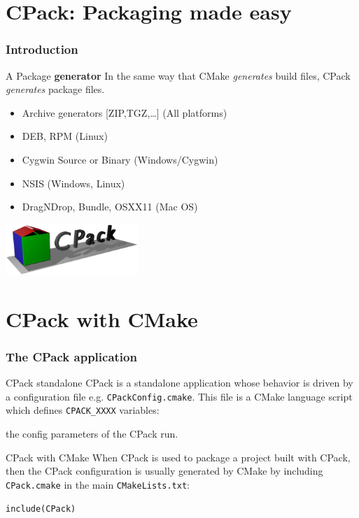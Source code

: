 \documentclass[compress,slidestop,table
              ]
               {beamer}
\newcommand{\fname}[1]{\texttt{#1}}
\begin{document}
\section{CPack: Packaging made easy}
\begin{frame}
\frametitle{Introduction}
\begin{block}{A Package \textbf{generator}}
In the same way that CMake \emph{generates} build files, CPack
\emph{generates} package files.
\end{block}

\begin{multicols}{2}
\begin{itemize}
\item Archive generators [ZIP,TGZ,\ldots] (All platforms)
\item DEB, RPM (Linux)
\item Cygwin Source or Binary (Windows/Cygwin)
\item NSIS (Windows, Linux)
\item DragNDrop, Bundle, OSXX11 (Mac OS)
\end{itemize}
\columnbreak
\includegraphics[width=5cm]{figures/CPack-logo-3D-opened-v2} \\
\end{multicols}
\end{frame}

\section{CPack with CMake}


\begin{frame}
\frametitle{The CPack application}
\begin{block}{CPack standalone}
CPack is a standalone application whose behavior is
driven by a configuration file e.g. \fname{CPackConfig.cmake}.
This file is a CMake language script which defines
\lstinline!CPACK_XXXX! variables:

the config parameters of the CPack run.
\end{block}
\begin{block}{CPack with CMake}
When CPack is used to package a project built with CPack,
then the CPack configuration is usually generated by CMake by
including \fname{CPack.cmake} in the main \fname{CMakeLists.txt}:

\lstinline!include(CPack)!
\end{block}
\end{frame}
\end{document}
